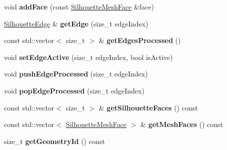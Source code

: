 \begin{DoxyCompactItemize}
\mbox{\label{classvisilib_1_1_silhouette_a164f9078080fda66bc0582cbc50f2ce5}} 
void {\bfseries add\+Face} (const \mbox{\hyperlink{classvisilib_1_1_silhouette_mesh_face}{Silhouette\+Mesh\+Face}} \&face)
\item 
\mbox{\label{classvisilib_1_1_silhouette_a9d3c9deb6cdb57c2419967fe3d71b65d}} 
\mbox{\hyperlink{structvisilib_1_1_silhouette_edge}{Silhouette\+Edge}} \& {\bfseries get\+Edge} (size\+\_\+t edge\+Index)
\item 
\mbox{\label{classvisilib_1_1_silhouette_ab6f83a6ed55054da0f1f9402ad98be50}} 
const std\+::vector$<$ size\+\_\+t $>$ \& {\bfseries get\+Edges\+Processed} ()
\item 
\mbox{\label{classvisilib_1_1_silhouette_ae2336b4ca01212d73381a7669517742f}} 
void {\bfseries set\+Edge\+Active} (size\+\_\+t edge\+Index, bool is\+Active)
\item 
\mbox{\label{classvisilib_1_1_silhouette_a704dfe9979ebcbe60941864ed2b48eaf}} 
void {\bfseries push\+Edge\+Processed} (size\+\_\+t edge\+Index)
\item 
\mbox{\label{classvisilib_1_1_silhouette_a97e2f1d0e2df11811a231b38a9b4da36}} 
void {\bfseries pop\+Edge\+Processed} (size\+\_\+t edge\+Index)
\item 
\mbox{\label{classvisilib_1_1_silhouette_a0c28adbad4f1a3ab7bb4c38aa50119fc}} 
const std\+::vector$<$ size\+\_\+t $>$ \& {\bfseries get\+Silhouette\+Faces} () const
\item 
\mbox{\label{classvisilib_1_1_silhouette_ac1bc22e6d6236705b73e410cf05ea1a6}} 
const std\+::vector$<$ \mbox{\hyperlink{classvisilib_1_1_silhouette_mesh_face}{Silhouette\+Mesh\+Face}} $>$ \& {\bfseries get\+Mesh\+Faces} () const
\item 
\mbox{\label{classvisilib_1_1_silhouette_a23e2f736daa7f10bcd20ba00fbedfc1c}} 
size\+\_\+t {\bfseries get\+Geometry\+Id} () const
\end{DoxyCompactItemize}
